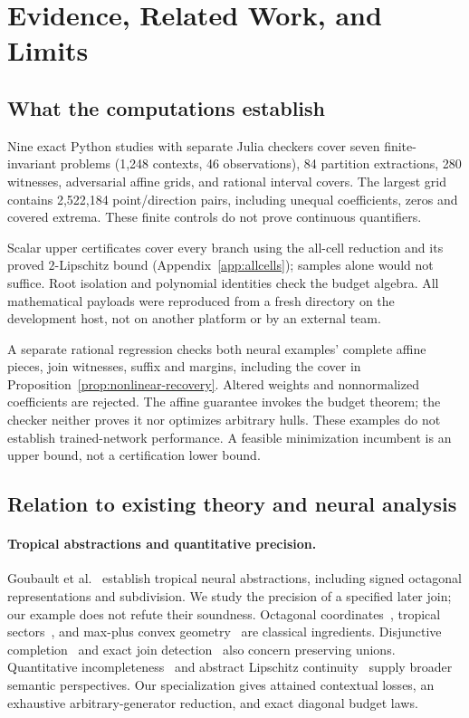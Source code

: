 \section{Evidence, Related Work, and Limits}\label{sec:evidence}
\subsection{What the computations establish}
Nine exact Python studies with separate Julia checkers cover seven finite-invariant problems (1,248 contexts, 46 observations), 84 partition extractions, 280 witnesses, adversarial affine grids, and rational interval covers. The largest grid contains 2,522,184 point/direction pairs, including unequal coefficients, zeros and covered extrema. These finite controls do not prove continuous quantifiers.

Scalar upper certificates cover every branch using the all-cell reduction and its proved $2$-Lipschitz bound (Appendix~\ref{app:allcells}); samples alone would not suffice. Root isolation and polynomial identities check the budget algebra. All mathematical payloads were reproduced from a fresh directory on the development host, not on another platform or by an external team.

A separate rational regression checks both neural examples' complete affine pieces, join witnesses, suffix and margins, including the cover in Proposition~\ref{prop:nonlinear-recovery}. Altered weights and nonnormalized coefficients are rejected. The affine guarantee invokes the budget theorem; the checker neither proves it nor optimizes arbitrary hulls. These examples do not establish trained-network performance. A feasible minimization incumbent is an upper bound, not a certification lower bound.

\subsection{Relation to existing theory and neural analysis}
\paragraph{Tropical abstractions and quantitative precision.}
Goubault et al.~\cite{goubault2021} establish tropical neural abstractions, including signed octagonal representations and subdivision. We study the precision of a specified later join; our example does not refute their soundness. Octagonal coordinates~\cite{mine2006}, tropical sectors~\cite{hill2020}, and max-plus convex geometry~\cite{gaubert2007} are classical ingredients. Disjunctive completion~\cite{giacobazzi1998} and exact join detection~\cite{bagnara2010} also concern preserving unions. Quantitative incompleteness~\cite{campion2023} and abstract Lipschitz continuity~\cite{campion2026} supply broader semantic perspectives. Our specialization gives attained contextual losses, an exhaustive arbitrary-generator reduction, and exact diagonal budget laws.

